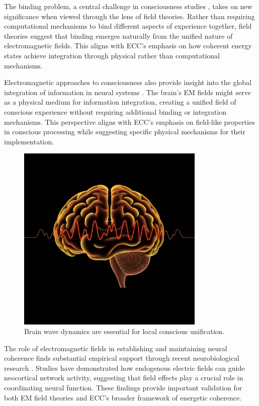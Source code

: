 The binding problem, a central challenge in consciousness studies \cite{Singer2001}, takes on new significance when viewed through the lens of field theories. Rather than requiring computational mechanisms to bind different aspects of experience together, field theories suggest that binding emerges naturally from the unified nature of electromagnetic fields. This aligns with ECC's emphasis on how coherent energy states achieve integration through physical rather than computational mechanisms.

Electromagnetic approaches to consciousness also provide insight into the global integration of information in neural systems \cite{John2001}. The brain's EM fields might serve as a physical medium for information integration, creating a unified field of conscious experience without requiring additional binding or integration mechanisms. This perspective aligns with ECC's emphasis on field-like properties in conscious processing while suggesting specific physical mechanisms for their implementation.

\begin{figure}[h]
    \centering
    \includegraphics[width=0.8\textwidth]{images/brain_waves.png}

    \caption{Brain wave dynamics are essential for local conscious unification.}
\end{figure}

The role of electromagnetic fields in establishing and maintaining neural coherence finds substantial empirical support through recent neurobiological research \cite{Frohlich2010}. Studies have demonstrated how endogenous electric fields can guide neocortical network activity, suggesting that field effects play a crucial role in coordinating neural function. These findings provide important validation for both EM field theories and ECC's broader framework of energetic coherence.


